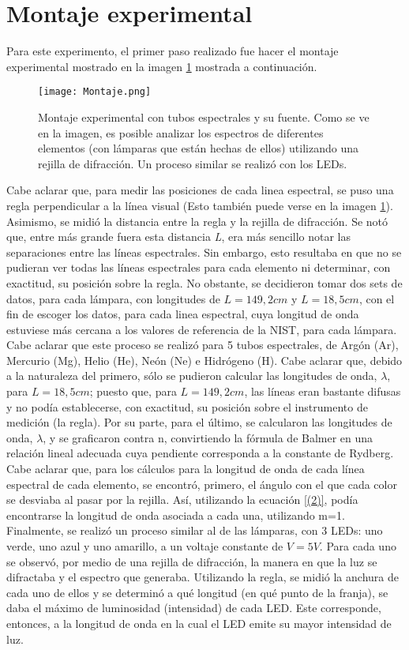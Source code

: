 \documentclass[%
 reprint,
 amsmath,amssymb,
 aps,
]{revtex4-1}
\begin{document}
\section{\label{sec:montaje} Montaje experimental}
Para este experimento, el primer paso realizado fue hacer el montaje experimental mostrado en la imagen \ref{fig:diagrama} mostrada a continuación. 
\begin{figure}[H]
    \centering
    \texttt{[image: Montaje.png]}
    \caption{Montaje experimental con tubos espectrales y su fuente. Como se ve en la imagen, es posible analizar los espectros de diferentes elementos (con lámparas que están hechas de ellos) utilizando una rejilla de difracción. Un proceso similar se realizó con los LEDs.}
    \label{fig:diagrama}
\end{figure}
Cabe aclarar que, para medir las posiciones de cada linea espectral, se puso una regla perpendicular a la línea visual (Esto también puede verse en la imagen \ref{fig:diagrama}). Asimismo, se midió la distancia entre la regla y la rejilla de difracción. Se notó que, entre más grande fuera esta distancia \textit{L}, era más sencillo notar las separaciones entre las líneas espectrales. Sin embargo, esto resultaba en que no se pudieran ver todas las líneas espectrales para cada elemento ni determinar, con exactitud, su posición sobre la regla. No obstante, se decidieron tomar dos sets de datos, para cada lámpara, con longitudes de $L=149,2 cm$ y $L=18,5 cm$, con el fin de escoger los datos, para cada linea espectral, cuya longitud de onda estuviese más cercana a los valores de referencia de la NIST, para cada lámpara. \\
Cabe aclarar que este proceso se realizó para 5 tubos espectrales, de Argón (Ar), Mercurio (Mg), Helio (He), Neón (Ne) e Hidrógeno (H). Cabe aclarar que, debido a la naturaleza del primero, sólo se pudieron calcular las longitudes de onda, $\lambda$, para $L=18,5 cm$; puesto que, para $L=149,2 cm$, las líneas eran bastante difusas y no podía establecerse, con exactitud, su posición sobre el instrumento de medición (la regla). Por su parte, para el último, se calcularon las longitudes de onda, $\lambda$, y se graficaron contra n, convirtiendo la fórmula de Balmer en una relación lineal adecuada cuya pendiente corresponda a la constante de Rydberg. Cabe aclarar que, para los cálculos para la longitud de onda de cada línea espectral de cada elemento, se encontró, primero, el ángulo con el que cada color se desviaba al pasar por la rejilla. Así, utilizando la ecuación \eqref{(2)}, podía encontrarse la longitud de onda asociada a cada una, utilizando m=1.\\
Finalmente, se realizó un proceso similar al de las lámparas, con 3 LEDs: uno verde, uno azul y uno amarillo, a un voltaje constante de $V=5V$. Para cada uno se observó, por medio de una rejilla de difracción, la manera en que la luz se difractaba y el espectro que generaba. Utilizando la regla, se midió la anchura de cada uno de ellos y se determinó a qué longitud (en qué punto de la franja), se daba el máximo de luminosidad (intensidad) de cada LED. Este corresponde, entonces, a la longitud de onda en la cual el LED emite su mayor intensidad de luz. \\
\end{document}
